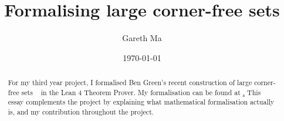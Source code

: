 \documentclass{article}[11px]
\title{Formalising large corner-free sets}
\author{Gareth Ma}
\date{\today}
\begin{document}
 \maketitle

\begin{abstract}
  For my third year project, I formalised Ben Green's recent construction of large corner-free sets ~\cite{Green2021} in the Lean 4 Theorem Prover. My formalisation can be found at \href{https://github.com/grhkm21/LeanCornerFree/tree/master}. This essay complements the project by explaining what mathematical formalisation actually is, and my contribution throughout the project.
\end{abstract}

\tableofcontents

\pagebreak

% 












% 



\clearpage
\printbibliography
\end{document}
